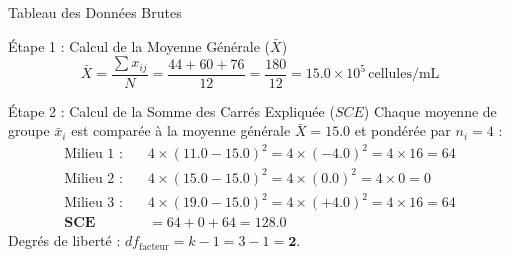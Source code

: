 \documentclass[11pt,a4paper]{article}
\begin{document}
\begin{stepbox}{Tableau des Données Brutes}
\begin{center}
\end{center}
\end{stepbox}

\begin{stepbox}{Étape 1 : Calcul de la Moyenne Générale ($\bar{X}$)}
\begin{equation*}
\bar{X} = \frac{\sum x_{ij}}{N} = \frac{44 + 60 + 76}{12} = \frac{180}{12} = \mathbf{15.0} \times 10^5\,\text{cellules/mL}
\end{equation*}
\end{stepbox}

\begin{stepbox}{Étape 2 : Calcul de la Somme des Carrés Expliquée ($SCE$)}
Chaque moyenne de groupe $\bar{x}_i$ est comparée à la moyenne générale $\bar{X} = 15.0$ et pondérée par $n_i = 4$ :
\begin{align*}
\text{Milieu 1 :} \quad & 4 \times (11.0 - 15.0)^2 = 4 \times (-4.0)^2 = 4 \times 16 = 64 \\
\text{Milieu 2 :} \quad & 4 \times (15.0 - 15.0)^2 = 4 \times (0.0)^2 = 4 \times 0 = 0 \\
\text{Milieu 3 :} \quad & 4 \times (19.0 - 15.0)^2 = 4 \times (+4.0)^2 = 4 \times 16 = 64 \\[2mm]
\mathbf{SCE} &= 64 + 0 + 64 = \mathbf{128.0}
\end{align*}
Degrés de liberté : $df_{\text{facteur}} = k - 1 = 3 - 1 = \mathbf{2}$.
\end{stepbox}
\end{document}
